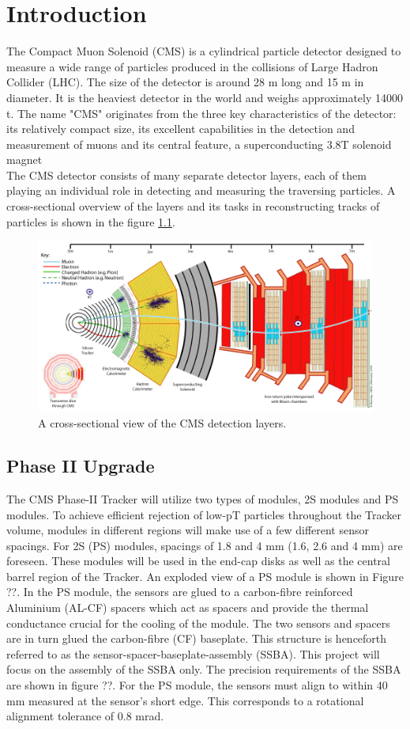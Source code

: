 \chapter{Introduction}

The Compact Muon Solenoid (CMS) is a cylindrical particle detector designed to measure a wide range of particles produced in the collisions of Large Hadron Collider (LHC). The size of the detector is around 28 m long and 15 m in diameter. It is the heaviest detector in the world and weighs approximately 14000 t. The name "CMS" originates from the three key characteristics of the detector: its relatively compact size, its excellent capabilities in the detection and measurement of muons and its central feature, a superconducting 3.8T solenoid magnet \cite{Reference1} \\
The CMS detector consists of many separate detector layers, each of them playing an individual role in detecting and measuring the traversing particles. A cross-sectional overview of the layers and its tasks in reconstructing tracks of particles is shown in the
figure \ref{fig:cms_layers}.
\begin{figure}[ht]\centering
\includegraphics[width=0.8\linewidth]{Data/CMS_layers.png}
\caption{A cross-sectional view of the CMS detection layers.}
\label{fig:cms_layers}
\end{figure}

\section{Phase II Upgrade}

The CMS Phase-II Tracker will utilize two types of modules, 2S modules and PS modules. To achieve efficient rejection of low-pT particles throughout the Tracker volume, modules in different regions will make use of a few different sensor spacings. For 2S (PS) modules, spacings of 1.8 and 4 mm (1.6, 2.6 and 4 mm) are foreseen. These modules will be used in the end-cap disks as well as the central barrel region of the Tracker. An exploded view of a PS module is shown in Figure ??. In the PS module, the sensors are glued to a carbon-fibre reinforced Aluminium (AL-CF) spacers which act as spacers and provide the thermal conductance crucial for the cooling of the module. The two sensors and spacers are in turn glued the carbon-fibre (CF) baseplate. This structure is henceforth referred to as the sensor-spacer-baseplate-assembly (SSBA). This project will focus on the assembly of the SSBA only. The precision requirements of the SSBA are shown in figure ??. For the PS module, the sensors must align to within 40 mm measured at the sensor’s short edge. This corresponds to a rotational alignment tolerance of 0.8 mrad.

